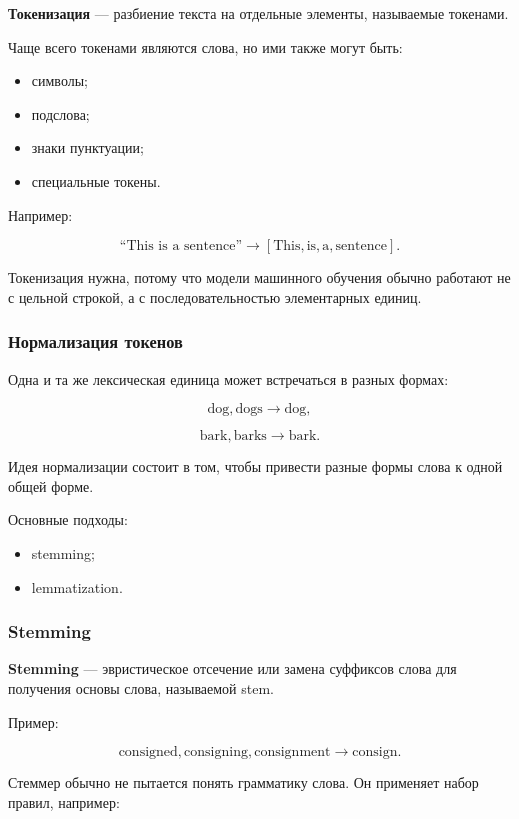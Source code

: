 \documentclass[a4paper,12pt]{article}
\begin{document}
\textbf{Токенизация} --- разбиение текста на отдельные элементы, называемые токенами.

Чаще всего токенами являются слова, но ими также могут быть:

\begin{itemize}
    \item символы;
    \item подслова;
    \item знаки пунктуации;
    \item специальные токены.
\end{itemize}

Например:

\[
\text{``This is a sentence''}
\longrightarrow
[\text{This}, \text{is}, \text{a}, \text{sentence}].
\]

Токенизация нужна, потому что модели машинного обучения обычно работают не с цельной строкой, а с последовательностью элементарных единиц.

\subsubsection{Нормализация токенов}

Одна и та же лексическая единица может встречаться в разных формах:

\[
\text{dog}, \text{dogs} \longrightarrow \text{dog},
\]

\[
\text{bark}, \text{barks} \longrightarrow \text{bark}.
\]

Идея нормализации состоит в том, чтобы привести разные формы слова к одной общей форме.

Основные подходы:

\begin{itemize}
    \item stemming;
    \item lemmatization.
\end{itemize}

\subsubsection{Stemming}

\textbf{Stemming} --- эвристическое отсечение или замена суффиксов слова для получения основы слова, называемой stem.

Пример:

\[
\text{consigned}, \text{consigning}, \text{consignment}
\longrightarrow
\text{consign}.
\]

Стеммер обычно не пытается понять грамматику слова. Он применяет набор правил, например:
\end{document}
